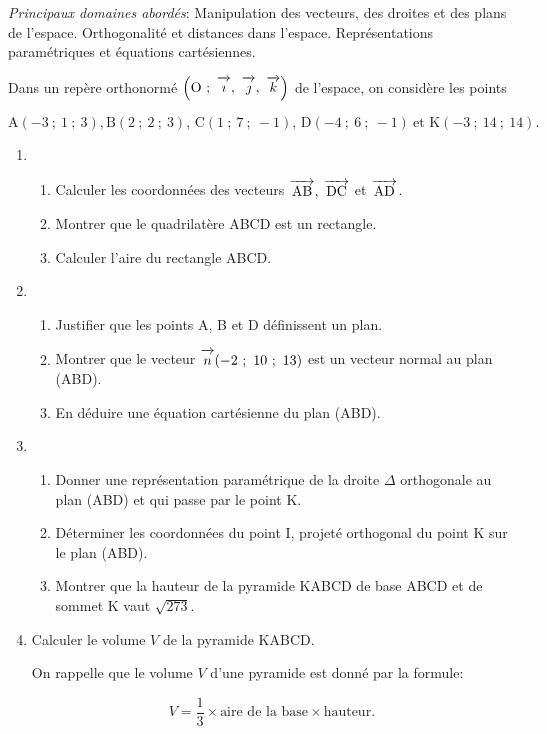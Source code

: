 \documentclass[10pt,a4paper]{article}
\newcommand{\vect}[1]{\overrightarrow{\,\mathstrut#1\,}}
\def\Oijk{$\left(\text{O}~;~\vect{\imath},~\vect{\jmath},~\vect{k}\right)$}
\begin{document}
\emph{Principaux domaines abordés}: Manipulation des vecteurs, des droites et des plans de l'espace. Orthogonalité et distances dans l'espace.
Représentations paramétriques et équations cartésiennes.

\bigskip

Dans un repère orthonormé \Oijk{} de l'espace,
on considère les points 

\[\text{A}(-3~;~1~;~3), \text{B}(2~;~2~;~3),\, \text{C}(1~;~7~;~-1), \,\text{D}(-4~;~6~;~-1)\: \text{et K}(-3~;~14~;~14).\]

\medskip

\begin{enumerate}
\item 
	\begin{enumerate}
		\item Calculer les coordonnées des vecteurs $\vect{\text{AB}},\: \vect{\text{DC}}$ et 
		$\vect{\text{AD}}$.
		\item Montrer que le quadrilatère ABCD est un rectangle.
		\item Calculer l'aire du rectangle ABCD.
	\end{enumerate}
\item 
	\begin{enumerate}
		\item Justifier que les points A, B et D définissent un plan.
		\item Montrer que le vecteur $\vect{n}(-2~;~10~;~13)$ est un vecteur normal au plan (ABD).
		\item En déduire une équation cartésienne du plan (ABD).
	\end{enumerate}
\item
	\begin{enumerate}
		\item Donner une représentation paramétrique de la droite $\Delta$ orthogonale au plan (ABD) et qui passe par le point K.
		\item Déterminer les coordonnées du point I, projeté orthogonal du point K sur le plan (ABD).
		\item Montrer que la hauteur de la pyramide KABCD de base ABCD et de sommet K
vaut $\sqrt{273}$.
	\end{enumerate}
\item Calculer le volume $V$ de la pyramide KABCD.

On rappelle que le volume $V$ d'une pyramide est donné par la formule:

\[V= \dfrac13 \times \text{aire de la base} \times \text{hauteur}.\]
\end{enumerate}
\end{document}
